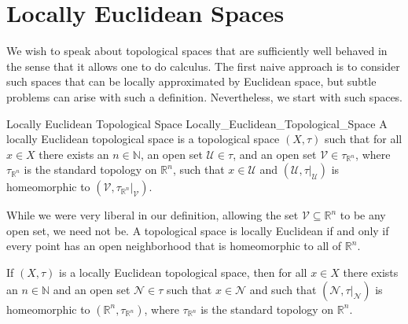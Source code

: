 \section{Locally Euclidean Spaces}
    We wish to speak about topological spaces that are sufficiently well behaved
    in the sense that it allows one to do calculus. The first naive approach is
    to consider such spaces that can be locally approximated by Euclidean space,
    but subtle problems can arise with such a definition. Nevertheless, we start
    with such spaces.
    \begin{fdefinition}{Locally Euclidean Topological Space}
                       {Locally_Euclidean_Topological_Space}
        A locally Euclidean topological space is a topological space $(X,\tau)$
        such that for all $x\in{X}$ there exists an $n\in\mathbb{N}$, an open
        set $\mathcal{U}\in\tau$, and an open set
        $\mathcal{V}\in\tau_{\mathbb{R}^{n}}$, where $\tau_{\mathbb{R}^{n}}$ is
        the standard topology on $\mathbb{R}^{n}$, such that $x\in\mathcal{U}$
        and $(\mathcal{U},\tau|_{\mathcal{U}})$ is homeomorphic to
        $(\mathcal{V},\tau_{\mathbb{R}^{n}}|_{\mathcal{V}})$.
    \end{fdefinition}
    While we were very liberal in our definition, allowing the set
    $\mathcal{V}\subseteq\mathbb{R}^{n}$ to be any open set, we need not be.
    A topological space is locally Euclidean if and only if every point has an
    open neighborhood that is homeomorphic to all of $\mathbb{R}^{n}$.
    \begin{theorem}
        If $(X,\tau)$ is a locally Euclidean topological space, then for all
        $x\in{X}$ there exists an $n\in\mathbb{N}$ and an open set
        $\mathcal{N}\in\tau$ such that $x\in\mathcal{N}$ and such that
        $(\mathcal{N},\tau|_{\mathcal{N}})$ is homeomorphic to
        $(\mathbb{R}^{n},\tau_{\mathbb{R}^{n}})$, where $\tau_{\mathbb{R}^{n}}$
        is the standard topology on $\mathbb{R}^{n}$.
    \end{theorem}
